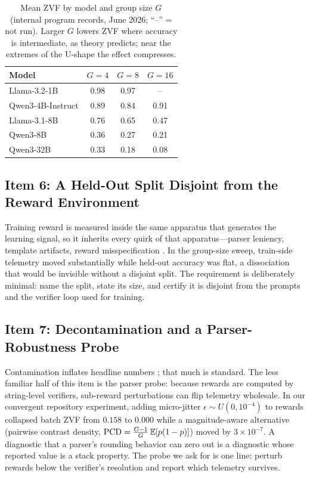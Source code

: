 \begin{table}[t]
\centering
\caption{Mean ZVF by model and group size $G$ (internal program records,
June 2026; ``--'' = not run). Larger $G$ lowers ZVF where accuracy is
intermediate, as theory predicts; near the extremes of the U-shape the effect
compresses.}
\label{tab:p5-gsize}
\small
\begin{tabular}{@{}lccc@{}}
\toprule
Model & $G=4$ & $G=8$ & $G=16$ \\
\midrule
Llama-3.2-1B      & 0.98 & 0.97 & --   \\
Qwen3-4B-Instruct & 0.89 & 0.84 & 0.91 \\
Llama-3.1-8B      & 0.76 & 0.65 & 0.47 \\
Qwen3-8B          & 0.36 & 0.27 & 0.21 \\
Qwen3-32B         & 0.33 & 0.18 & 0.08 \\
\bottomrule
\end{tabular}
\end{table}

\subsection{Item 6: A Held-Out Split Disjoint from the Reward Environment}
\label{sec:p5-item6}
Training reward is measured inside the same apparatus that generates the
learning signal, so it inherits every quirk of that apparatus---parser
leniency, template artifacts, reward misspecification
\citep{gao2023reward, krakovna2020specification}. In the \ours{} group-size
sweep, train-side telemetry moved substantially while held-out accuracy was
flat, a dissociation that would be invisible without a disjoint split. The
requirement is deliberately minimal: name the split, state its size, and
certify it is disjoint from the prompts and the verifier loop used for
training.

\subsection{Item 7: Decontamination and a Parser-Robustness Probe}
\label{sec:p5-item7}
Contamination inflates headline numbers \citep{zhang2024gsm1k,
riddell2024contamination}; that much is standard. The less familiar half of
this item is the parser probe: because rewards are computed by string-level
verifiers, sub-reward perturbations can flip telemetry wholesale. In our
convergent repository experiment, adding micro-jitter
$\epsilon \sim U(0, 10^{-4})$ to rewards collapsed batch ZVF from $0.158$ to
$0.000$ while a magnitude-aware alternative (pairwise contrast density,
$\mathrm{PCD} = \frac{G-1}{G}\,\mathbb{E}[p(1-p)]$) moved by $3\times 10^{-7}$. A
diagnostic that a parser's rounding behavior can zero out is a diagnostic
whose reported value is a stack property. The probe we ask for is one line:
perturb rewards below the verifier's resolution and report which telemetry
survives.

